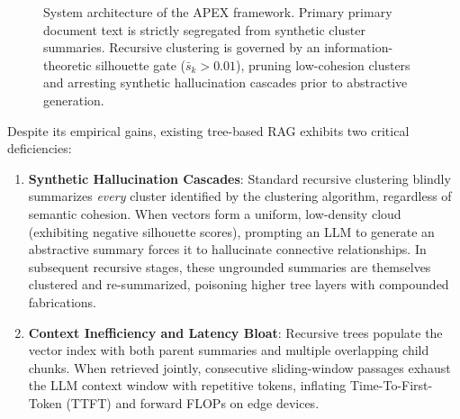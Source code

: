 \documentclass[11pt,a4paper]{article}
\begin{document}
\begin{figure}[t]
\caption{System architecture of the APEX framework. Primary primary document text is strictly segregated from synthetic cluster summaries. Recursive clustering is governed by an information-theoretic silhouette gate ($\bar{s}_k > 0.01$), pruning low-cohesion clusters and arresting synthetic hallucination cascades prior to abstractive generation.}
\label{fig:architecture}
\end{figure}

Despite its empirical gains, existing tree-based RAG exhibits two critical deficiencies:
\begin{enumerate}
    \item \textbf{Synthetic Hallucination Cascades}: Standard recursive clustering blindly summarizes \textit{every} cluster identified by the clustering algorithm, regardless of semantic cohesion. When vectors form a uniform, low-density cloud (exhibiting negative silhouette scores), prompting an LLM to generate an abstractive summary forces it to hallucinate connective relationships. In subsequent recursive stages, these ungrounded summaries are themselves clustered and re-summarized, poisoning higher tree layers with compounded fabrications.
    \item \textbf{Context Inefficiency and Latency Bloat}: Recursive trees populate the vector index with both parent summaries and multiple overlapping child chunks. When retrieved jointly, consecutive sliding-window passages exhaust the LLM context window with repetitive tokens, inflating Time-To-First-Token (TTFT) and forward FLOPs on edge devices.
\end{enumerate}
\end{document}
